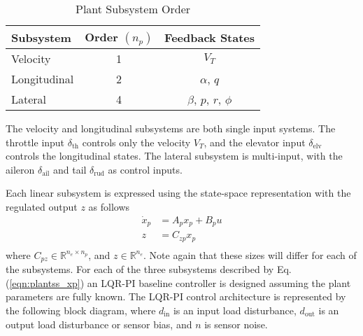 \documentclass[]{../sty/aiaa-tc}
\begin{document}
  \begin{table}[H]
    \centering
    \caption{Plant Subsystem Order}
    \fontsize{10pt}{10pt}\selectfont
    \begin{tabular}{lcc}
      \toprule
      Subsystem & Order $(n_{p})$ & Feedback States \\
      \midrule
      Velocity & 1 & $V_{T}$ \\
      Longitudinal & 2 & $\alpha$, $q$ \\
      Lateral & 4 & $\beta$, $p$, $r$, $\phi$ \\
      \bottomrule
    \end{tabular}
  \end{table}

  The velocity and longitudinal subsystems are both single input systems.
  The throttle input $\delta_{\text{th}}$ controls only the velocity $V_{T}$, and the elevator input $\delta_{\text{elv}}$ controls the longitudinal states.
  The lateral subsystem is multi-input, with the aileron $\delta_{\text{ail}}$ and tail $\delta_{\text{rud}}$ as control inputs.

  Each linear subsystem is expressed using the state-space representation with the regulated output $z$ as follows
  \begin{equation}
    \label{eqn:plantss_xp}
    \begin{split}
      \dot{x}_{p}&=A_{p}x_{p}+B_{p}u \\
      z&=C_{zp}x_{p} \\
    \end{split}
  \end{equation}
  where $C_{pz}\in\mathbb{R}^{n_{e}\times n_{p}}$, and $z\in\mathbb{R}^{n_{e}}$.
  Note again that these sizes will differ for each of the subsystems.
  For each of the three subsystems described by Eq. (\ref{eqn:plantss_xp}) an LQR-PI baseline controller is designed assuming the plant parameters are fully known.
  The LQR-PI control architecture is represented by the following block diagram, where $d_{\text{in}}$ is an input load disturbance, $d_{\text{out}}$ is an output load disturbance or sensor bias, and $n$ is sensor noise.
\end{document}
